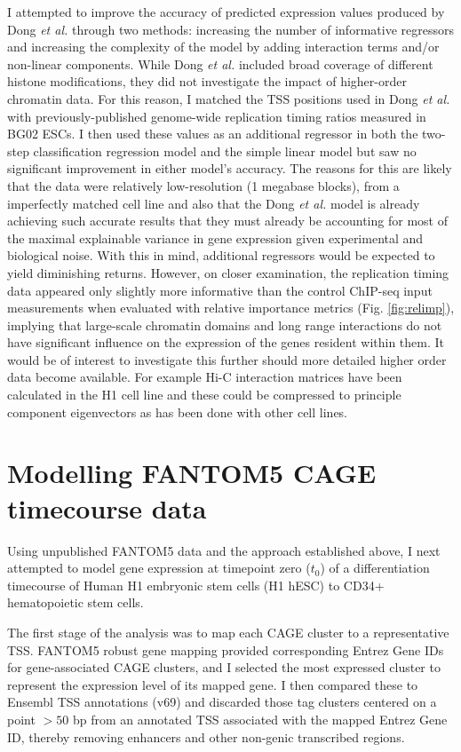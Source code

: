 \documentclass[a4paper,11pt,oneside]{book}
\begin{document}
I attempted to improve the accuracy of predicted expression values
produced by Dong \emph{et al.} through two methods: increasing the number of informative
regressors and increasing the complexity of the model by adding
interaction terms and/or non-linear components. While Dong \emph{et
  al.} included broad coverage of different histone modifications,
they did not investigate the impact of higher-order
chromatin data. For this reason, I matched the TSS positions used in
Dong \emph{et al.} with previously-published genome-wide replication
timing ratios measured in BG02 ESCs.\cite{Ryba2010} I then used these values as an additional
regressor in both the two-step classification regression model and the
simple linear model but saw no significant improvement in either
model's accuracy. The reasons for this are likely that the 
data were relatively low-resolution (1 megabase blocks), from a
imperfectly matched cell line and also that
the Dong \emph{et al.} model is already achieving such accurate
results that they must already be accounting for most of the maximal
explainable variance in gene expression given experimental and
biological noise. With this in mind, additional regressors would be
expected to yield diminishing returns. However, on closer examination,
the replication timing data
appeared only slightly more informative than the control ChIP-seq input
measurements when evaluated with relative importance metrics
(Fig. \ref{fig:relimp}), implying that large-scale chromatin domains
and long range interactions
do not have significant influence on the expression of the genes resident within them. It would
be of interest to investigate this further should more detailed higher order
data become available. For example Hi-C interaction matrices have been
calculated in the H1 cell line\cite{Dixon2012} and these could be
compressed to principle component eigenvectors as has been done with
other cell lines.\cite{Lieberman2011}

\section{Modelling FANTOM5 CAGE timecourse data}
Using unpublished FANTOM5 data and the approach established above, I next attempted to model gene
expression at timepoint zero ($t_0$) of a differentiation timecourse of Human
H1 embryonic stem cells (H1 hESC) to CD34+ hematopoietic stem
cells.

The first stage of the analysis was to map each CAGE cluster to a
representative TSS. FANTOM5 robust gene mapping\cite{fantom5}
provided corresponding Entrez Gene IDs for gene-associated CAGE
clusters, and I selected the most expressed cluster to represent the
expression level of its mapped gene. I then compared these to Ensembl
TSS annotations (v69) and
discarded those tag clusters centered on a point $>50$ bp from an annotated
TSS associated with the mapped Entrez Gene ID, thereby removing enhancers and other non-genic transcribed
regions.
\end{document}
